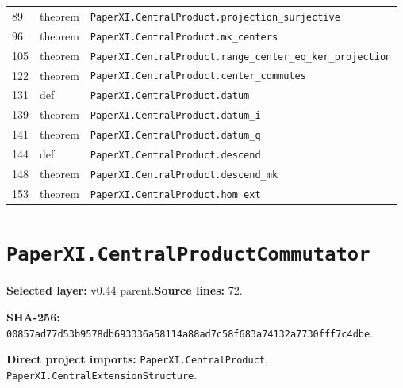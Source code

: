 \documentclass[10pt,oneside]{book}
\begin{document}
\begin{longtable}{@{}p{}p{}p{}@{}}
89&theorem&\nolinkurl{PaperXI.CentralProduct.projection_surjective}\\

96&theorem&\nolinkurl{PaperXI.CentralProduct.mk_centers}\\

105&theorem&\nolinkurl{PaperXI.CentralProduct.range_center_eq_ker_projection}\\

122&theorem&\nolinkurl{PaperXI.CentralProduct.center_commutes}\\

131&def&\nolinkurl{PaperXI.CentralProduct.datum}\\

139&theorem&\nolinkurl{PaperXI.CentralProduct.datum_i}\\

141&theorem&\nolinkurl{PaperXI.CentralProduct.datum_q}\\

144&def&\nolinkurl{PaperXI.CentralProduct.descend}\\

148&theorem&\nolinkurl{PaperXI.CentralProduct.descend_mk}\\

153&theorem&\nolinkurl{PaperXI.CentralProduct.hom_ext}\\

\bottomrule\end{longtable}

\section{\texorpdfstring{\nolinkurl{PaperXI.CentralProductCommutator}}{PaperXI.CentralProductCommutator}}\label{module:PaperXI.CentralProductCommutator}

\textbf{Selected layer:} v0.44 parent.\quad\textbf{Source lines:} 72.\par\textbf{SHA-256:} {\scriptsize\nolinkurl{00857ad77d53b9578db693336a58114a88ad7c58f683a74132a7730fff7c4dbe}}.


\textbf{Direct project imports:} \nolinkurl{PaperXI.CentralProduct}, \nolinkurl{PaperXI.CentralExtensionStructure}.
\end{document}
